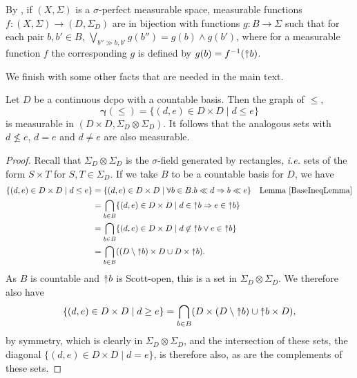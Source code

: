 \documentclass{lmcs}
\newcommand{\uu}{\rotatebox[origin=c]{90}{$\twoheadrightarrow$}}
\newcommand{\graph}{\pmb{\gamma}}
\begin{document}
By \cite[Proposition 9 (ii)]{unresStoneProc}, if $(X,\Sigma)$ is a $\sigma$-perfect measurable space, measurable functions $f : (X,\Sigma) \rightarrow (D,\Sigma_D)$ are in bijection with functions $g : B \rightarrow \Sigma$ such that for each pair $b,b' \in B$, $\bigvee_{b'' \gg b,b'}g(b'') = g(b) \land g(b')$, where for a measurable function $f$ the corresponding $g$ is defined by $g(b) = f^{-1}(\uu b)$.

We finish with some other facts that are needed in the main text. 

\begin{lem}
\label{GraphMbleLemma}
Let $D$ be a continuous dcpo with a countable basis. Then the graph of $\leq$,
\[
\graph(\leq) = \{ (d,e) \in D \times D \mid d \leq e \}
\]
is measurable in $(D \times D, \Sigma_D \otimes \Sigma_D)$. It follows that the analogous sets with $d \not\leq e$, $d = e$ and $d \neq e$ are also measurable.
\end{lem}
\begin{proof}
Recall that $\Sigma_D \otimes \Sigma_D$ is the $\sigma$-field generated by rectangles, \emph{i.e.} sets of the form $S \times T$ for $S,T \in \Sigma_D$. If we take $B$ to be a countable basis for $D$, we have
\begin{align*}
\{ (d,e) \in D \times D \mid d \leq e \} &= \{ (d,e) \in D \times D \mid \forall b \in B. b \ll d \Rightarrow b \ll e \} & \text{Lemma \ref{BaseIneqLemma}} \\
 &= \bigcap_{b \in B} \{ (d,e) \in D \times D \mid d \in \uu b \Rightarrow e \in \uu b \} \\
 &= \bigcap_{b \in B} \{ (d,e) \in D \times D \mid d \not\in \uu b \lor e \in \uu b \} \\
 &= \bigcap_{b \in B} ((D \setminus \uu b) \times D \cup D \times \uu b).
\end{align*}
As $B$ is countable and $\uu b$ is Scott-open, this is a set in $\Sigma_D \otimes \Sigma_D$. We therefore also have
\[
\{ (d,e) \in D \times D \mid d \geq e \} = \bigcap_{b \in B} (D \times (D \setminus \uu b) \cup \uu b \times D),
\]
by symmetry, which is clearly in $\Sigma_D \otimes \Sigma_D$, and the intersection of these sets, the diagonal $\{ (d,e) \in D \times D \mid d = e \}$, is therefore also, as are the complements of these sets. 
\end{proof}
\end{document}
